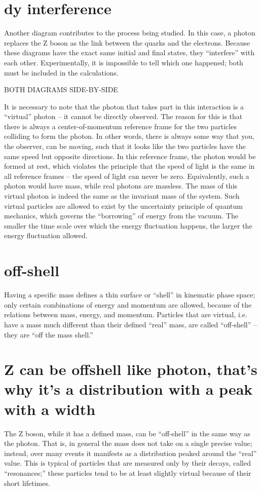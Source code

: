 \section{dy interference}
Another diagram contributes to the process being studied. 
In this case, a photon replaces the Z boson 
as the link between the quarks and the electrons.  
Because these diagrams have the exact same 
initial and final states, 
they ``interfere'' with each other.  
Experimentally, it is impossible to tell which one happened; 
both must be included in the calculations.  %

BOTH DIAGRAMS SIDE-BY-SIDE

It is necessary to note that the photon that takes 
part in this interaction is a ``virtual'' photon -- 
it cannot be directly observed.  
The reason for this is that there is always a 
center-of-momentum reference 
frame for the two particles colliding to form the photon.  
In other words, there is always some way that you, 
the observer, can be moving, 
such that it looks like the two particles 
have the same speed but opposite directions.  
In this reference frame, the photon would be formed at rest, 
which violates the principle that the speed of light 
is the same in all reference frames -- 
the speed of light can never be zero.  
Equivalently, such a photon would have mass, 
while real photons are massless.  
The mass of this virtual photon is indeed the same 
as the invariant mass of the system.  
Such virtual particles are allowed to exist 
by the uncertainty principle of quantum mechanics, 
which governs the ``borrowing'' of energy from the vacuum.  
The smaller the time scale over which the energy 
fluctuation happens, 
the larger the energy fluctuation allowed.  
\section{off-shell}
Having a specific mass defines a thin 
surface or ``shell'' in kinematic phase space; 
only certain combinations of energy and momentum 
are allowed, 
because of the relations between mass, energy, and momentum.  
Particles that are virtual, 
i.e. have a mass much different than their 
defined ``real'' mass, 
are called ``off-shell'' -- 
they are ``off the mass shell.''  
\section{Z can be offshell like photon, that's why it's a distribution with a peak with a width}
The Z boson, while it has a defined mass, 
can be ``off-shell'' in the same way as the photon.  
That is, in general the 
mass 
does not take on a single precise value; 
instead, over many events it manifests as a distribution 
peaked around the ``real'' value.  
This is typical of particles that are measured only 
by their decays, called ``resonances;'' 
these particles tend to be at least slightly virtual 
because of their short lifetimes.  
